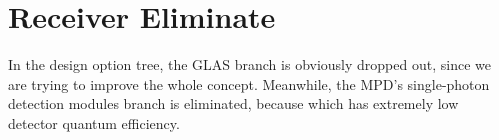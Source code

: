 \section{Receiver Eliminate}
\label{mtrTOReceiver}
In the design option tree, the GLAS branch is obviously dropped out, since we are trying to improve the whole concept. Meanwhile, the \ac{MPD}'s single-photon detection modules branch is eliminated, because which has extremely low detector quantum efficiency. 